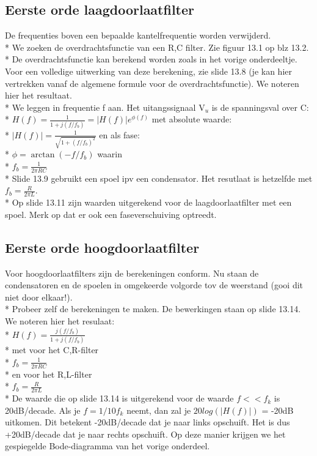 \documentclass[10pt]{article}
\begin{document}
\subsection{Eerste orde laagdoorlaatfilter}
De frequenties boven een bepaalde kantelfrequentie worden verwijderd.\\*
We zoeken de overdrachtsfunctie van een R,C filter. Zie figuur 13.1 op blz 13.2.\\*
De overdrachtsfunctie kan berekend worden zoals in het vorige onderdeeltje. Voor een volledige uitwerking van deze berekening, zie slide 13.8 (je kan hier vertrekken vanaf de algemene formule voor de overdrachtsfunctie). We noteren hier het resultaat.\\*
We leggen in frequentie f aan. Het uitangssignaal V$_u$ is de spanningsval over C:\\*
$H(f) = \frac{1}{1+j(f/f_b)} = |H(f)|e^{\phi(f)}$ met absolute waarde:\\*
$|H(f)| = \frac{1}{\sqrt{1+ (f/f_b)^2}}$ en als fase:\\*
$\phi = \arctan{(-f/f_b)}$ waarin\\*
$f_b = \frac{1}{2\pi RC}$\\*
Slide 13.9 gebruikt een spoel ipv een condensator. Het resutlaat is hetzelfde met $f_b = \frac{R}{2\pi L}$.\\*
Op slide 13.11 zijn waarden uitgerekend voor de laagdoorlaatfilter met een spoel. Merk op dat er ook een faseverschuiving optreedt.
\subsection{Eerste orde hoogdoorlaatfilter}
Voor hoogdoorlaatfilters zijn de berekeningen conform. Nu staan de condensatoren en de spoelen in omgekeerde volgorde tov de weerstand (gooi dit niet door elkaar!).\\*
Probeer zelf de berekeningen te maken. De bewerkingen staan op slide 13.14. We noteren hier het resulaat:\\*
$H(f) = \frac{j(f/f_b)}{1+j(f/f_b)}$\\*
met voor het C,R-filter\\*
$f_b = \frac{1}{2\pi RC}$\\*
en voor het R,L-filter\\*
$f_b = \frac{R}{2\pi L}$\\*
De waarde die op slide 13.14 is uitgerekend voor de waarde $f<<f_k$ is 20dB/decade. Als je $f=1/10f_k$ neemt, dan zal je $20log(|H(f)|)$ = -20dB uitkomen. Dit betekent -20dB/decade dat je naar links opschuift. Het is dus +20dB/decade dat je naar rechts opschuift. Op deze manier krijgen we het gespiegelde Bode-diagramma van het vorige onderdeel.
\end{document}
